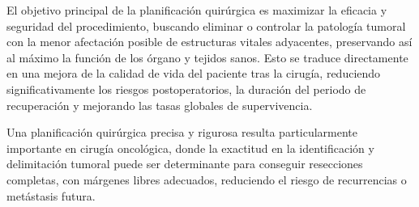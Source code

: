 El objetivo principal de la planificación quirúrgica es maximizar la eficacia y seguridad del procedimiento, buscando eliminar o controlar la patología tumoral con la menor afectación posible de estructuras vitales adyacentes, preservando así al máximo la función de los órgano y tejidos sanos. Esto se traduce directamente en una mejora de la calidad de vida del paciente tras la cirugía, reduciendo significativamente los riesgos postoperatorios, la duración del periodo de recuperación y mejorando las tasas globales de supervivencia\cite{Birkmeyer2012}. 

Una planificación quirúrgica precisa y rigurosa resulta particularmente importante en cirugía oncológica, donde la exactitud en la identificación y delimitación tumoral puede ser determinante para conseguir resecciones completas, con márgenes libres adecuados, reduciendo el riesgo de recurrencias o metástasis futura\cite{NCCN2023}.


